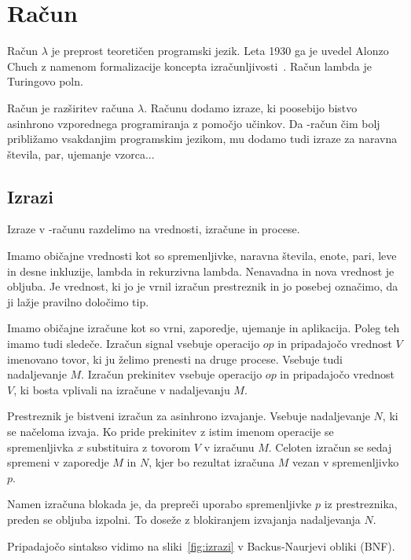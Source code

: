 \section{Račun \lae{}}\label{sec:lae}

Račun $\lambda$ je preprost teoretičen programski jezik. Leta 1930 ga je uvedel Alonzo Chuch z namenom formalizacije koncepta izračunljivosti~\cite{rojas2015tutorial}. Račun lambda je Turingovo poln.


Račun \lae{} je razširitev računa $\lambda$. Računu \lae{} dodamo izraze, ki poosebijo bistvo asinhrono vzporednega programiranja z pomočjo učinkov. Da \lae{}-račun čim bolj približamo vsakdanjim programskim jezikom, mu dodamo tudi izraze za  naravna števila, par, ujemanje vzorca...


\subsection{Izrazi}

Izraze v \lae{}-računu razdelimo na vrednosti, izračune in procese. 


Imamo običajne vrednosti kot so spremenljivke, naravna števila, enote, pari, leve in desne inkluzije, lambda in rekurzivna lambda.
Nenavadna in nova vrednost je obljuba. Je vrednost, ki jo je vrnil izračun prestreznik in jo posebej označimo, da ji lažje pravilno določimo tip.

Imamo običajne izračune kot so vrni, zaporedje, ujemanje in aplikacija.
Poleg teh imamo tudi sledeče.
Izračun signal vsebuje operacijo $op$ in pripadajočo vrednost $V$ imenovano tovor, ki ju želimo prenesti na druge procese. Vsebuje tudi nadaljevanje $M$.
Izračun prekinitev vsebuje operacijo $op$ in pripadajočo vrednost $V$, ki bosta vplivali na izračune v nadaljevanju $M$. 

Prestreznik je bistveni izračun za asinhrono izvajanje. Vsebuje nadaljevanje $N$, ki se načeloma izvaja.
Ko pride prekinitev z istim imenom operacije se spremenljivka $x$ substituira z tovorom $V$ v izračunu $M$. Celoten izračun se sedaj spremeni v zaporedje $M$ in $N$, kjer bo rezultat izračuna $M$ vezan v spremenljivko $p$.
 
Namen izračuna blokada je, da prepreči uporabo spremenljivke $p$ iz prestreznika, preden se obljuba izpolni. To doseže z blokiranjem izvajanja nadaljevanja $N$.


Pripadajočo sintakso vidimo na sliki~\ref{fig:izrazi} v Backus-Naurjevi obliki (BNF).

